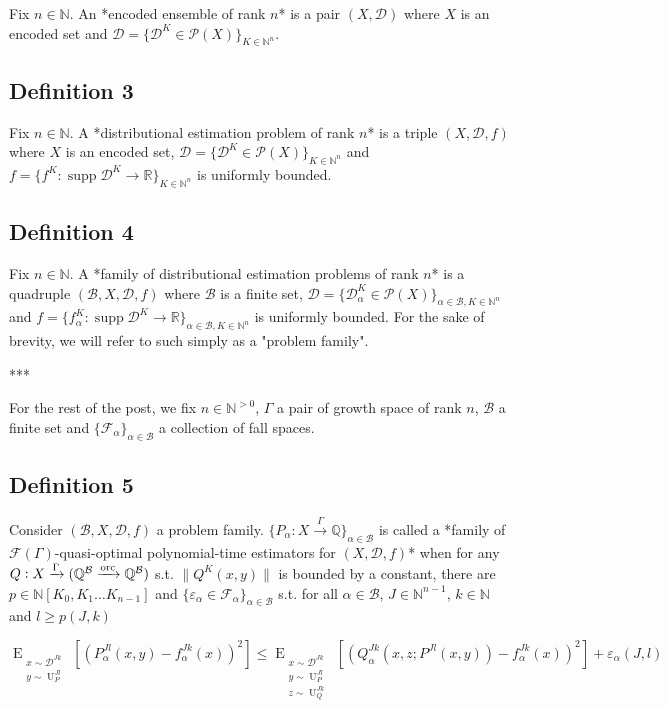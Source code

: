 \documentclass[a4paper]{article}
\DeclareMathOperator{\Supp}{supp}
\newcommand{\EE}[2]{\operatorname{E}_{\substack{#1 \\ #2}}}
\newcommand{\EEE}[3]{\operatorname{E}_{\substack{#1 \\ #2 \\ #3}}}
\DeclareMathOperator{\Un}{U}
\newcommand{\Nats}{\mathbb{N}}
\newcommand{\Rats}{\mathbb{Q}}
\newcommand{\Reals}{\mathbb{R}}
\newcommand{\NatPoly}{\Nats[K_0, K_1 \ldots K_{n-1}]}
\newcommand{\Norm}[1]{\lVert #1 \rVert}
\newcommand{\Dist}{\mathcal{D}}
\newcommand{\Fall}{\mathcal{F}}
\newcommand{\EG}{\Fall(\Gamma)}
\newcommand{\Scheme}{\xrightarrow{\Gamma}}
\newcommand{\ORC}{\xrightarrow{\textnormal{orc}}}
\newcommand{\Base}{\mathcal{B}}
\newcommand{\Prob}{\mathcal{P}}
\newcommand{\QBO}{\Rats^\Base \ORC \Rats^\Base}
\begin{document}
Fix ${n \in \Nats}$. An *encoded ensemble of rank ${n}$* is a pair ${(X,\Dist)}$ where ${X}$ is an encoded set and ${\Dist=\{\Dist^K \in \Prob(X)\}_{K \in \Nats^n}}$.

\subsection{Definition 3}

Fix ${n \in \Nats}$. A *distributional estimation problem of rank ${n}$* is a triple ${(X,\Dist,f)}$ where ${X}$ is an encoded set, ${\Dist=\{\Dist^K \in \Prob(X)\}_{K \in \Nats^n}}$ and ${f = \{f^K: \Supp \Dist^K \rightarrow \Reals\}_{K \in \Nats^n}}$ is uniformly bounded.

\subsection{Definition 4}

Fix ${n \in \Nats}$. A *family of distributional estimation problems of rank ${n}$* is a quadruple ${(\Base,X,\Dist,f)}$ where ${\Base}$ is a finite set, ${\Dist=\{\Dist_\alpha^K \in \Prob(X)\}_{\alpha \in \Base, K \in \Nats^n}}$ and ${f = \{f_\alpha^K: \Supp \Dist^K \rightarrow \Reals\}_{\alpha \in \Base, K \in \Nats^n}}$ is uniformly bounded. For the sake of brevity, we will refer to such simply as a "problem family".

***

For the rest of the post, we fix ${n \in \Nats^{>0}}$, ${\Gamma}$ a pair of growth space of rank ${n}$, ${\Base}$ a finite set and ${\{\Fall_\alpha\}_{\alpha \in \Base}}$ a collection of fall spaces. 

\subsection{Definition 5}

Consider ${(\Base, X, \Dist, f)}$ a problem family. ${\{P_\alpha: X \Scheme \Rats\}_{\alpha \in \Base}}$ is called a *family of ${\EG}$-quasi-optimal polynomial-time estimators for ${(X,\Dist,f)}$* when for any ${Q: X \Scheme (\QBO)}$ s.t. ${\Norm{Q^K(x,y)}}$ is bounded by a constant, there are ${p \in \NatPoly}$ and ${\{\varepsilon_\alpha \in \Fall_\alpha\}_{\alpha \in \Base}}$ s.t. for all ${\alpha \in \Base}$, ${J \in \Nats^{n-1}}$, ${k \in \Nats}$ and ${l \geq p(J,k)}$

$$\EE{x \sim \Dist^{Jk}}{y \sim \Un_P^{Jl}}[(P_\alpha^{Jl}(x,y)-f_\alpha^{Jk}(x))^2] \leq \EEE{x \sim \Dist^{Jk}}{y \sim \Un_P^{Jl}}{z \sim \Un_Q^{Jk}}[(Q_\alpha^{Jk}(x,z;P^{Jl}(x,y))-f_\alpha^{Jk}(x))^2]+\varepsilon_\alpha(J,l)$$
\end{document}
